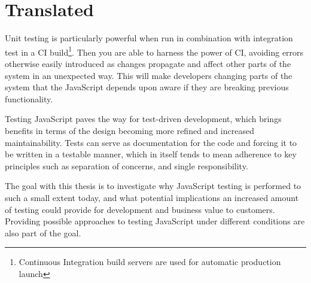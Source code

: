 \documentclass[11pt]{article}
\begin{document}
\section{Translated}

Unit testing is particularly powerful when run in combination with integration test in a CI build\footnote{Continuous Integration build servers are used for automatic production launch}. Then you are able to harness the power of CI, avoiding errors otherwise easily introduced as changes propagate and affect other parts of the system in an unexpected way. This will make developers changing parts of the system that the JavaScript depends upon aware if they are breaking previous functionality.

Testing JavaScript paves the way for test-driven development, which brings benefits in terms of the design becoming more refined and increased maintainability. Tests can serve as documentation for the code and forcing it to be written in a testable manner, which in itself tends to mean adherence to key principles such as separation of concerns, and single responsibility.

The goal with this thesis is to investigate why JavaScript testing is performed to such a small extent today, and what potential implications an increased amount of testing could provide for development and business value to customers. Providing possible approaches to testing JavaScript under different conditions are also part of the goal.
\end{document}
